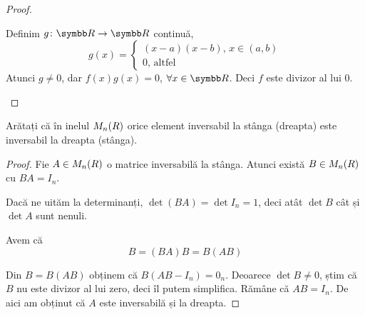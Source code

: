 \begin{exercise}[1.15]
\begin{itemize}
\begin{proof}
\begin{itemize}
        Definim \(\function{g}{\reals}{\reals}\) continuă,
        \[
        g(x) = \begin{cases}
            (x - a)(x - b), \, x \in (a, b) \\
            0, \, \text{altfel}
        \end{cases}
        \]
        Atunci \(g \neq 0\), dar \(f(x)g(x) = 0\), \(\forall x \in \reals\). Deci \(f\) este divizor al lui 0.
    \end{itemize}
    \end{proof}
\end{itemize}
\end{exercise}

\begin{exercise}[1.17]
Arătați că în inelul \(M_{n}({R})\) orice element inversabil la stânga (dreapta) este inversabil la dreapta (stânga).
\end{exercise}
\begin{proof}
Fie \(A \in M_{n}({R})\) o matrice inversabilă la stânga. Atunci există \(B \in M_{n}({R})\) cu \(B A = I_n\).

Dacă ne uităm la determinanți, \(\det (B A) = \det I_n = 1\), deci atât \(\det B\) cât și \(\det A\) sunt nenuli.

Avem că
\[
B = (B A) B = B (A B)
\]

Din \(B = B (A B)\) obținem că \(B (A B - I_n) = 0_n\). Deoarece \(\det B \neq 0\), știm că \(B\) nu este divizor al lui zero, deci îl putem simplifica. Rămâne că \(A B = I_n\). De aici am obținut că \(A\) este inversabilă și la dreapta.
\end{proof}

